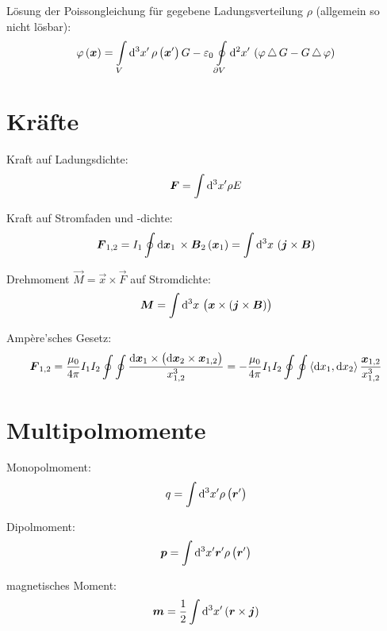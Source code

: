 Lösung der Poissongleichung für gegebene Ladungsverteilung $\rho$ (allgemein so
nicht lösbar):
\[
	\varphi\del{\vec x}
	= \intop_{V} \dif{^3 x'} \, \rho\del{\vec x'} G
	- \varepsilon_0 \ointop_{\partial V} \dif{^2 x'} \,
	\del{\varphi \laplace G - G \laplace \varphi}
\]

\section{Kräfte}

Kraft auf Ladungsdichte:
\[
	\vec F
	= \int \dif{^3 x'} \rho E
\]

Kraft auf Stromfaden und -dichte:
\[
	\vec F_{1,2}
	= I_1 \oint \dif{\vec x_1} \, \times \vec B_2\del{\vec x_1}
	= \int \dif{^3 x} \, \del{\vec j \times \vec B}
\]

Drehmoment $\vec M = \vec x \times \vec F$ auf Stromdichte:
\[
	\vec M
	= \int \dif{^3 x} \, \del{\vec x \times \del{\vec j \times \vec B}}
\]

Ampère'sches Gesetz:
\[
	\vec F_{1,2}
	= \frac{\mu_0}{4 \pi} I_1 I_2 \oint \oint \frac{\dif \vec x_1 \times \del{\dif \vec x_2 \times \vec x_{1,2}}}{x_{1,2}^3}
	= - \frac{\mu_0}{4 \pi} I_1 I_2 \oint \oint \inner{\dif x_1}{\dif x_2} \frac{\vec x_{1,2}}{x_{1,2}^3}
\]

\section{Multipolmomente}

Monopolmoment:
\[
	q
	= \int \dif{^3 x'} \rho\del{\vec r'}
\]

Dipolmoment:
\[
	\vec p
	= \int \dif{^3 x'} \vec r' \rho\del{\vec r'}
\]

magnetisches Moment:
\[
	\vec m
	= \half \int \dif{^3 x'} \del{\vec r \times \vec j}
\]


%	
%	



